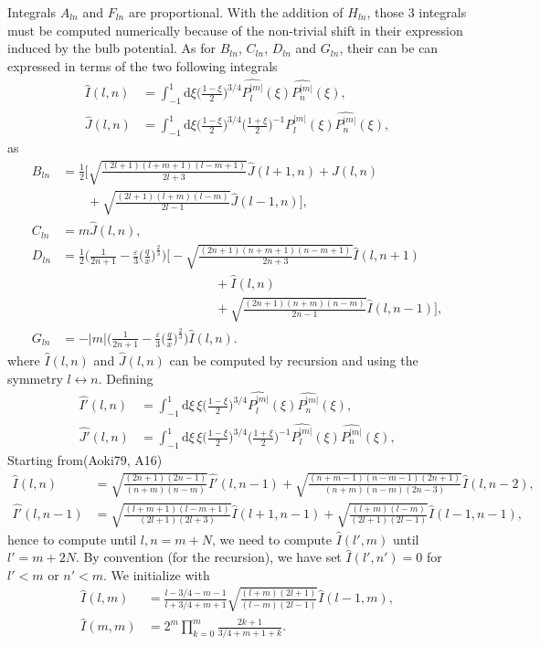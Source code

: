 \documentclass[11pt]{article}
\newcommand{\rd}{\mathrm{d}}
\newcommand{\Pnm}{P_n^{|m|}}
\newcommand{\Plm}{P_l^{|m|}}
\newcommand{\hPnm}{\widehat{\Pnm}}
\newcommand{\hPlm}{\widehat{\Plm}}
\newcommand{\hI}{\widehat{I}}
\newcommand{\hJ}{\widehat{J}}
\newcommand{\hIp}{\widehat{I'}}
\newcommand{\hJp}{\widehat{J'}}
\begin{document}
Integrals $A_{ln}$ and  $F_{ln}$ are proportional. With the addition of $H_{ln}$, those 3 integrals must be computed numerically because of the non-trivial shift in their expression induced by the bulb potential. As for $B_{ln}$, $C_{ln}$, $D_{ln}$ and $G_{ln}$, their can be can expressed in terms of the two following integrals 
\begin{align}
\hI(l,n) &= \int_{-1}^{1} \rd \xi  \bigg(\frac{1-\xi}{2}\bigg)^{3/4} \hPlm(\xi)  \hPnm(\xi), \\
\hJ(l,n) &= \int_{-1}^{1} \rd \xi  \bigg(\frac{1-\xi}{2}\bigg)^{3/4}  \bigg(\frac{1+\xi}{2}\bigg)^{-1}\hPlm(\xi)  \hPnm(\xi) ,
\end{align}
as
\begin{align*}
B_{ln} &= \frac{1}{2} \bigg[ \sqrt{\frac{(2l+1)(l+m+1)(l-m+1)}{2l+3}} \hJ(l+1,n)+ \hJ(l,n)\\
&\quad \quad  +\sqrt{\frac{(2l+1)(l+m)(l-m)}{2l-1}} \hJ(l-1,n)\bigg] ,\\
C_{ln} &= m \hJ(l,n) ,\\
D_{ln} &= \frac{1}{2}  \bigg(\frac{1}{2n+1}-\frac{\varepsilon}{3}  \bigg(\frac{q}{x}\bigg)^{\frac{2}{3}} \bigg)
\bigg[ -\sqrt{\frac{(2n+1)(n+m+1)(n-m+1)}{2n+3}} \hI(l,n+1) \\
&\quad \quad \quad \quad \quad \quad\quad \quad\quad \quad \quad \quad+ \hI(l,n) \\
&\quad \quad \quad \quad \quad \quad\quad \quad\quad \quad \quad \quad  +\sqrt{\frac{(2n+1)(n+m)(n-m)}{2n-1}} \hI(l,n-1)\bigg] ,\\
G_{ln} &= -|m| \bigg(\frac{1}{2n+1}-\frac{\varepsilon}{3}  \bigg(\frac{q}{x}\bigg)^{\frac{2}{3}} \bigg)  \hI(l,n) .
\end{align*}
where $\hI(l,n)$ and $\hJ(l,n)$ can be computed by recursion and using the symmetry $l\leftrightarrow n$. Defining
\begin{align}
\hIp(l,n) &= \int_{-1}^{1} \rd \xi \, \xi \bigg(\frac{1-\xi}{2}\bigg)^{3/4} \hPlm(\xi)  \hPnm(\xi), \\
\hJp(l,n) &= \int_{-1}^{1} \rd \xi \, \xi \bigg(\frac{1-\xi}{2}\bigg)^{3/4}  \bigg(\frac{1+\xi}{2}\bigg)^{-1}\hPlm(\xi)  \hPnm(\xi) ,
\end{align}
Starting from(Aoki79, A16)
\begin{align*}
\hI(l,n) &= \sqrt{\frac{(2n+1)(2n-1)}{(n+m)(n-m)}} \hIp(l,n-1)+\sqrt{\frac{(n+m-1)(n-m-1)(2n+1)}{(n+m)(n-m)(2n-3)}} \hI(l,n-2) ,\\
\hIp(l,n-1) &= \sqrt{\frac{(l+m+1)(l-m+1)}{(2l+1)(2l+3)}} \hI(l+1,n-1)+\sqrt{\frac{(l+m)(l-m)}{(2l+1)(2l-1)}} \hI(l-1,n-1) ,
\end{align*}
hence to compute until $l,n=m+N$, we need to compute $\hI(l',m)$ until $l'=m+2N$. By convention (for the recursion), we have set $\hI(l',n')=0$ for $l'<m$ or  $n'<m$.
We initialize with
\begin{align*}
\hI(l,m) &= \frac{l-3/4-m-1}{l+3/4+m+1} \sqrt{\frac{(l+m)(2l+1)}{(l-m)(2l-1)}} \hI(l-1,m) ,\\
\hI(m,m) &= 2^m \prod_{k=0}^{m} \frac{2k+1}{3/4 + m + 1 + k} .
\end{align*}
\end{document}
